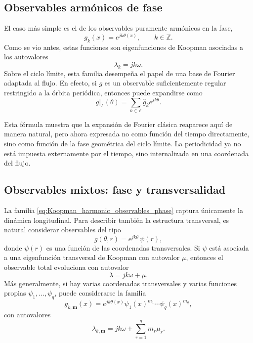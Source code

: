 \subsection{Observables armónicos de fase}

El caso más simple es el de los observables puramente armónicos en la fase,
\begin{equation}
g_k(x)=e^{jk\theta(x)},
\qquad
k\in\mathbb{Z}.
\label{eq:Koopman_harmonic_observables_phase}
\end{equation}
Como se vio antes, estas funciones son eigenfunciones de Koopman asociadas a los autovalores
\begin{equation}
\lambda_k=jk\omega.
\label{eq:Koopman_harmonic_observables_phase_eigs}
\end{equation}
Sobre el ciclo límite, esta familia desempeña el papel de una base de Fourier adaptada al flujo. En efecto, si \(g\) es un observable suficientemente regular restringido a la órbita periódica, entonces puede expandirse como
\begin{equation}
g|_{\Gamma}(\theta)=\sum_{k\in\mathbb{Z}}\hat{g}_k e^{jk\theta}.
\label{eq:Koopman_harmonic_observables_fourier}
\end{equation}

Esta fórmula muestra que la expansión de Fourier clásica reaparece aquí de manera natural, pero ahora expresada no como función del tiempo directamente, sino como función de la fase geométrica del ciclo límite. La periodicidad ya no está impuesta externamente por el tiempo, sino internalizada en una coordenada del flujo.

\subsection{Observables mixtos: fase y transversalidad}

La familia \eqref{eq:Koopman_harmonic_observables_phase} captura únicamente la dinámica longitudinal. Para describir también la estructura transversal, es natural considerar observables del tipo
\begin{equation}
g(\theta,r)=e^{jk\theta}\,\psi(r),
\label{eq:Koopman_harmonic_observables_mixed}
\end{equation}
donde \(\psi(r)\) es una función de las coordenadas transversales. Si \(\psi\) está asociada a una eigenfunción transversal de Koopman con autovalor \(\mu\), entonces el observable total evoluciona con autovalor
\begin{equation}
\lambda=jk\omega+\mu.
\label{eq:Koopman_harmonic_observables_mixed_eig}
\end{equation}
Más generalmente, si hay varias coordenadas transversales y varias funciones propias \(\psi_1,\dots,\psi_q\), puede considerarse la familia
\begin{equation}
g_{k,\mathbf{m}}(x)
=
e^{jk\theta(x)}
\psi_1(x)^{m_1}\cdots\psi_q(x)^{m_q},
\label{eq:Koopman_harmonic_observables_general}
\end{equation}
con autovalores
\begin{equation}
\lambda_{k,\mathbf{m}}
=
jk\omega+\sum_{r=1}^{q}m_r\mu_r.
\label{eq:Koopman_harmonic_observables_general_eig}
\end{equation}

